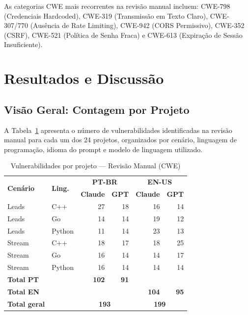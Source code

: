 \documentclass[12pt]{article}
\begin{document}
As categorias CWE mais recorrentes na revisão manual incluem: CWE-798 (Credenciais Hardcoded), CWE-319 (Transmissão em Texto Claro), CWE-307/770 (Ausência de Rate Limiting), CWE-942 (CORS Permissivo), CWE-352 (CSRF), CWE-521 (Política de Senha Fraca) e CWE-613 (Expiração de Sessão Insuficiente).

\section{Resultados e Discussão}
\label{sec:resultados}

\subsection{Visão Geral: Contagem por Projeto}

A Tabela~\ref{tab:resultados_completos} apresenta o número de vulnerabilidades identificadas na revisão manual para cada um dos 24 projetos, organizados por cenário, linguagem de programação, idioma do prompt e modelo de linguagem utilizado.

\begin{table}[H]
\centering
\caption{Vulnerabilidades por projeto — Revisão Manual (CWE)}
\label{tab:resultados_completos}
\begin{tabular}{llrrrr}
\toprule
\multirow{2}{*}{\textbf{Cenário}} & \multirow{2}{*}{\textbf{Ling.}} &
\multicolumn{2}{c}{\textbf{PT-BR}} & \multicolumn{2}{c}{\textbf{EN-US}} \\
 & & \textbf{Claude} & \textbf{GPT} & \textbf{Claude} & \textbf{GPT} \\
\midrule
Leads & C++ & 27 & 18 & 16 & 14 \\
Leads & Go  & 14 & 14 & 19 & 12 \\
Leads & Python & 11 & 14 & 23 & 13 \\
\midrule
Stream & C++ & 18 & 17 & 18 & 25 \\
Stream & Go  & 16 & 14 & 14 & 17 \\
Stream & Python & 16 & 14 & 14 & 14 \\
\midrule
\textbf{Total PT} & & \textbf{102} & \textbf{91} & & \\
\textbf{Total EN} & & & & \textbf{104} & \textbf{95} \\
\textbf{Total geral} & & \multicolumn{2}{c}{\textbf{193}} & \multicolumn{2}{c}{\textbf{199}} \\
\bottomrule
\end{tabular}
\end{table}
\end{document}

